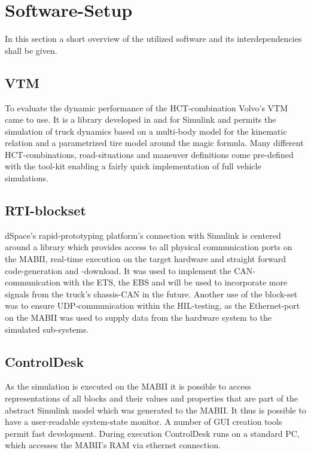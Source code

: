\documentclass[root.tex]{subfiles}
\begin{document}
{\pagestyle{empty}}
\section{Software-Setup}
\label{chap:Software-Setup}
In this section a short overview of the utilized software and its interdependencies shall be given. 

\subsection{\gls{VTM}}

To evaluate the dynamic performance of the \gls{HCT}-combination Volvo's \gls{VTM} came to use. It is a library developed in and for Simulink and permits the simulation of truck dynamics based on a multi-body model for the kinematic relation and a parametrized tire model around the magic formula. Many different \gls{HCT}-combinations, road-situations and maneuver definitions come pre-defined with the tool-kit enabling a fairly quick implementation of full vehicle simulations. 

\subsection{RTI-blockset}

dSpace's rapid-prototyping platform's connection with Simulink is centered around a library which provides access to all physical communication ports on the \gls{MABII}, real-time execution on the target hardware and straight forward code-generation and -download. It was used to implement the \gls{CAN}-communication with the \gls{ETS}, the \gls{EBS} and will be used to incorporate more signals from the truck's chassis-\gls{CAN} in the future. Another use of the block-set was to ensure \gls{UDP}-communication within the \gls{HIL}-testing, as the Ethernet-port on the \gls{MABII} was used to supply data from the hardware system to the simulated sub-systems.

\subsection{ControlDesk}

As the simulation is executed on the \gls{MABII} it is possible to access representations of all blocks and their values and properties that are part of the abstract Simulink model which was generated to the \gls{MABII}. It thus is possible to have a user-readable system-state monitor. A number of \gls{GUI} creation tools permit fast development. During execution ControlDesk runs on a standard PC, which accesses the \gls{MABII}'s RAM via ethernet connection. 

\end{document}
